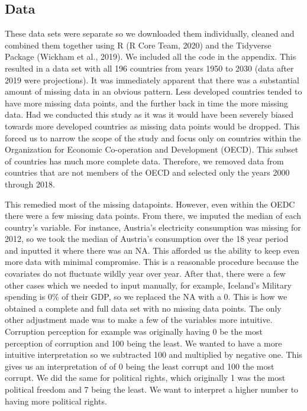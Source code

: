 \documentclass[
  english,
  man,floatsintext]{apa6}
\begin{document}
\hypertarget{data}{%
\subsection{Data}\label{data}}

These data sets were separate so we downloaded them individually, cleaned and combined them together using R (R Core Team, 2020) and the Tidyverse Package (Wickham et al., 2019). We included all the code in the appendix. This resulted in a data set with all 196 countries from years 1950 to 2030 (data after 2019 were projections). It was immediately apparent that there was a substantial amount of missing data in an obvious pattern. Less developed countries tended to have more missing data points, and the further back in time the more missing data. Had we conducted this study as it was it would have been severely biased towards more developed countries as missing data points would be dropped. This forced us to narrow the scope of the study and focus only on countries within the Organization for Economic Co-operation and Development (OECD). This subset of countries has much more complete data. Therefore, we removed data from countries that are not members of the OECD and selected only the years 2000 through 2018.

This remedied most of the missing datapoints. However, even within the OEDC there were a few missing data points. From there, we imputed the median of each country's variable. For instance, Austria's electricity consumption was missing for 2012, so we took the median of Austria's consumption over the 18 year period and inputted it where there was an NA. This afforded us the ability to keep even more data with minimal compromise. This is a reasonable procedure because the covariates do not fluctuate wildly year over year. After that, there were a few other cases which we needed to input manually, for example, Iceland's Military spending is 0\% of their GDP, so we replaced the NA with a 0. This is how we obtained a complete and full data set with no missing data points. The only other adjustment made was to make a few of the variables more intuitive. Corruption perception for example was originally having 0 be the most perception of corruption and 100 being the least. We wanted to have a more intuitive interpretation so we subtracted 100 and multiplied by negative one. This gives us an interpretation of of 0 being the least corrupt and 100 the most corrupt. We did the same for political rights, which originally 1 was the most political freedom and 7 being the least. We want to interpret a higher number to having more political rights.
\end{document}
